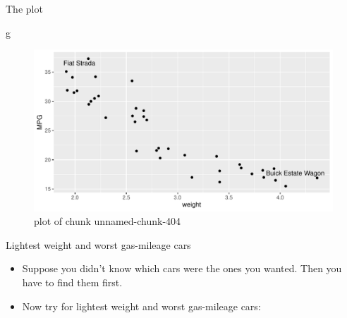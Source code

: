 \documentclass[
  ignorenonframetext,
]{beamer}
\newenvironment{Shaded}{\begin{snugshade}}{\end{snugshade}}
\newcommand{\DataTypeTok}[1]{\textcolor[rgb]{0.13,0.29,0.53}{#1}}
\newcommand{\KeywordTok}[1]{\textcolor[rgb]{0.13,0.29,0.53}{\textbf{#1}}}
\newcommand{\NormalTok}[1]{#1}
\newcommand{\OperatorTok}[1]{\textcolor[rgb]{0.81,0.36,0.00}{\textbf{#1}}}
\newcommand{\StringTok}[1]{\textcolor[rgb]{0.31,0.60,0.02}{#1}}
\providecommand{\tightlist}{%
  \setlength{\itemsep}{0pt}\setlength{\parskip}{0pt}}
\begin{document}
\begin{frame}[fragile]{The plot}
\protect\hypertarget{the-plot-6}{}

\begin{Shaded}
\begin{Highlighting}[]
\NormalTok{g}
\end{Highlighting}
\end{Shaded}

\begin{figure}
\centering
\includegraphics{figure/unnamed-chunk-404-1.pdf}
\caption{plot of chunk unnamed-chunk-404}
\end{figure}

\end{frame}

\begin{frame}[fragile]{Lightest weight and worst gas-mileage cars}
\protect\hypertarget{lightest-weight-and-worst-gas-mileage-cars}{}

\begin{itemize}
\tightlist
\item
  Suppose you didn't know which cars were the ones you wanted. Then you
  have to find them first.
\item
  Now try for lightest weight and worst gas-mileage cars:
\end{itemize}

\begin{Shaded}
\end{Shaded}

\end{frame}
\end{document}
